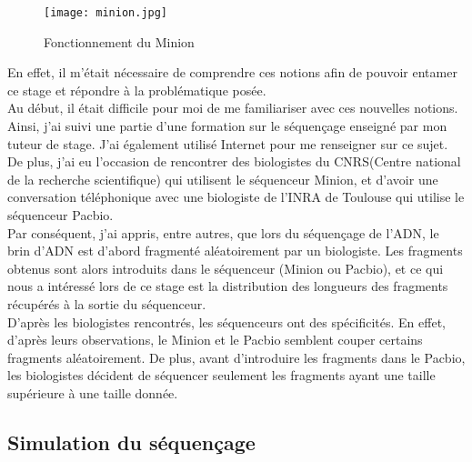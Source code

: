 \documentclass[11pt,a4paper]{article} %
\begin{document}
\begin{figure}[h]
  \centering
  \texttt{[image: minion.jpg]}
  \caption{\small Fonctionnement du Minion}
\end{figure} 
En effet, il m'était nécessaire de comprendre ces notions afin de pouvoir entamer ce stage et répondre à la problématique posée.\\
Au début, il était difficile pour moi de me familiariser avec ces nouvelles notions.
Ainsi, j'ai suivi une partie d'une formation sur le séquençage enseigné par mon tuteur de stage. J'ai également utilisé Internet pour me renseigner sur ce sujet. De plus, j'ai eu l'occasion de rencontrer des biologistes du CNRS(Centre national de la recherche scientifique) qui utilisent le séquenceur Minion, et d'avoir une conversation téléphonique avec une biologiste de l'INRA de Toulouse qui utilise le séquenceur Pacbio.\\
Par conséquent, j'ai appris, entre autres, que lors du séquençage de l'ADN, le brin d'ADN est d'abord fragmenté aléatoirement par un biologiste. Les fragments obtenus sont alors introduits dans le séquenceur (Minion ou Pacbio), et ce qui nous a intéressé lors de ce stage est la distribution des longueurs des fragments récupérés à la sortie du séquenceur. \\
D'après les biologistes rencontrés, les séquenceurs ont des spécificités. En effet, d'après leurs observations, le Minion et le Pacbio semblent couper certains fragments aléatoirement. De plus, avant d'introduire les fragments dans le Pacbio, les biologistes décident de séquencer seulement les fragments ayant une taille supérieure à une taille donnée.  \\

\subsection{Simulation du séquençage}
\end{document}
